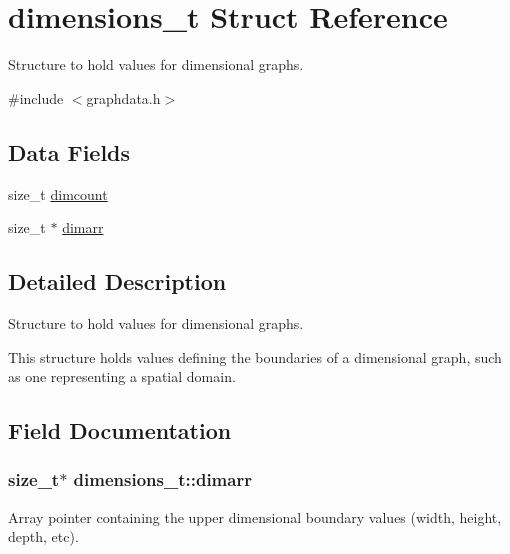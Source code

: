 \hypertarget{structdimensions__t}{}\section{dimensions\+\_\+t Struct Reference}
\label{structdimensions__t}


Structure to hold values for dimensional graphs.  




{\ttfamily \#include $<$graphdata.\+h$>$}

\subsection*{Data Fields}
\begin{DoxyCompactItemize}
\item 
size\+\_\+t \hyperlink{structdimensions__t_a025871853cf8339459bab76ea0f6fef6}{dimcount}
\item 
size\+\_\+t $\ast$ \hyperlink{structdimensions__t_ac9048802def4d663bf295c5b662a3b49}{dimarr}
\end{DoxyCompactItemize}


\subsection{Detailed Description}
Structure to hold values for dimensional graphs. 

This structure holds values defining the boundaries of a dimensional graph, such as one representing a spatial domain. 

\subsection{Field Documentation}
\subsubsection[{\texorpdfstring{dimarr}{dimarr}}]{\setlength{\rightskip}{0pt plus 5cm}size\+\_\+t$\ast$ dimensions\+\_\+t\+::dimarr}\hypertarget{structdimensions__t_ac9048802def4d663bf295c5b662a3b49}{}\label{structdimensions__t_ac9048802def4d663bf295c5b662a3b49}
Array pointer containing the upper dimensional boundary values (width, height, depth, etc). 
